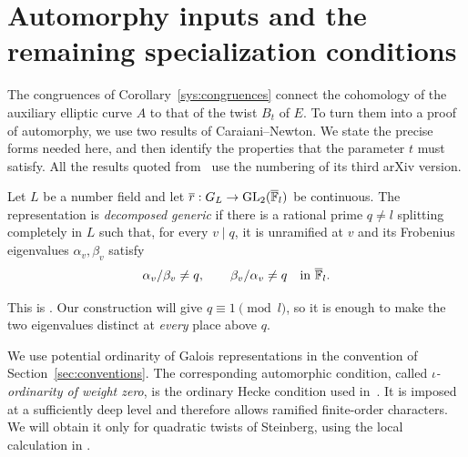 \section{Automorphy inputs and the remaining specialization conditions}
\label{sec:inputs}

The congruences of Corollary~\ref{sys:congruences} connect the cohomology
of the auxiliary elliptic curve $A$ to that of the twist $B_t$ of $E$.
To turn them into a proof of automorphy, we use two results of
Caraiani--Newton. We state the precise forms needed here, and then identify
the properties that the parameter $t$ must satisfy. All the results quoted
from~\cite{CN} use the numbering of its third arXiv version.

\begin{definition}\label{def:decomposed-generic}
Let $L$ be a number field and let
$\overline r:G_L\to\operatorname{GL}_2(\overline{\mathbb F}_l)$ be continuous. The representation
is \emph{decomposed generic} if there is a rational prime $q\ne l$ splitting
completely in $L$ such that, for every $v\mid q$, it is unramified at $v$
and its Frobenius eigenvalues $\alpha_v,\beta_v$ satisfy
\[
 \alpha_v/\beta_v\ne q,\qquad \beta_v/\alpha_v\ne q
 \quad\text{in }\overline{\mathbb F}_l.
\]
\end{definition}

This is \cite[Definition~2.1.27]{CN}. Our construction will give
$q\equiv1\pmod l$, so it is enough to make the two eigenvalues distinct at
\emph{every} place above $q$.

We use potential ordinarity of Galois representations in the convention of
Section~\ref{sec:conventions}. The corresponding automorphic condition,
called \emph{$\iota$-ordinarity of weight zero}, is the ordinary Hecke
condition used in~\cite[Theorem~5.2]{CN}. It is imposed at a sufficiently deep
level and therefore allows ramified finite-order characters. We will obtain
it only for quadratic twists of Steinberg, using the local calculation in
\cite[Lemma~6.1.3(4)]{CN}.

